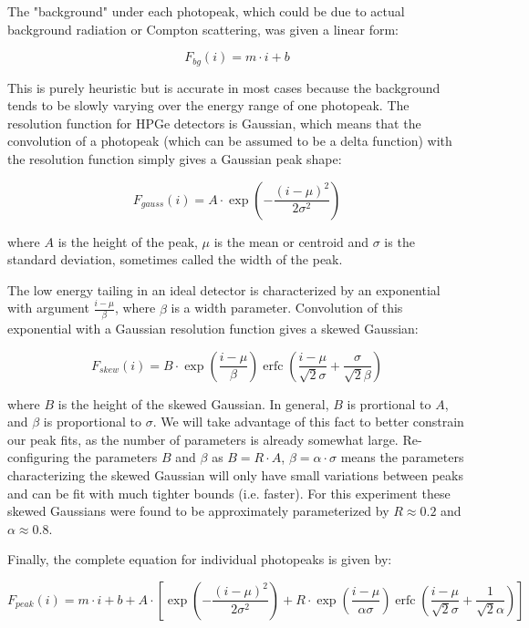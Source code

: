 \documentclass[aps,twocolumn,secnumarabic,balancelastpage,amsmath,amssymb,nofootinbib,floatfix]{revtex4-1}
\DeclareMathOperator\erfc{erfc}
\begin{document}
The "background" under each photopeak, which could be due to actual background radiation or Compton scattering, was given a linear form:

\begin{equation}
F_{bg}(i) = m\cdot i + b
\label{eq:background}
\end{equation}

This is purely heuristic but is accurate in most cases because the background tends to be slowly varying over the energy range of one photopeak.  The resolution function for HPGe detectors is Gaussian, which means that the convolution of a photopeak (which can be assumed to be a delta function) with the resolution function simply gives a Gaussian peak shape:

\begin{equation}
F_{gauss}(i) = A\cdot \exp (-\frac{(i-\mu)^2}{2\sigma^2})
\label{eq:gaussian}
\end{equation}

where $A$ is the height of the peak, $\mu$ is the mean or centroid and $\sigma$ is the standard deviation, sometimes called the width of the peak.

The low energy tailing in an ideal detector is characterized by an exponential with argument $\frac{i-\mu}{\beta}$, where $\beta$ is a width parameter.  Convolution of this exponential with a Gaussian resolution function gives a skewed Gaussian:

\begin{equation}
F_{skew}(i) = B\cdot \exp (\frac{i-\mu}{\beta}) \erfc (\frac{i-\mu}{\sqrt{2}\sigma}+\frac{\sigma}{\sqrt{2}\beta})
\label{eq:skew}
\end{equation}

where $B$ is the height of the skewed Gaussian.  In general, $B$ is prortional to $A$, and $\beta$ is proportional to $\sigma$.  We will take advantage of this fact to better constrain our peak fits, as the number of parameters is already somewhat large.  Re-configuring the parameters $B$ and $\beta$ as $B = R\cdot A$, $\beta = \alpha \cdot \sigma$ means the parameters characterizing the skewed Gaussian will only have small variations between peaks and can be fit with much tighter bounds (i.e. faster).  For this experiment these skewed Gaussians were found to be approximately parameterized by $R \approx 0.2$ and $\alpha \approx 0.8$.

Finally, the complete equation for individual photopeaks is given by:

\begin{equation}
F_{peak}(i) = m\cdot i + b + A\cdot [\exp (-\frac{(i-\mu)^2}{2\sigma^2}) + R\cdot \exp (\frac{i-\mu}{\alpha \sigma}) \erfc (\frac{i-\mu}{\sqrt{2}\sigma}+\frac{1}{\sqrt{2}\alpha})]
\label{eq:peak}
\end{equation}
\end{document}
